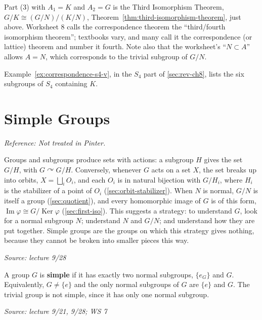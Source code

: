 \documentclass[11pt]{report}
\newcommand{\srcline}[1]{\par\hfill{\footnotesize\textit{Source: #1}}}
\begin{document}
\begin{rembox}\label{rem:naming-isomorphism-theorems}
Part (3) with $A_1 = K$ and $A_2 = G$ is the Third Isomorphism Theorem, $G/K \cong (G/N)/(K/N)$, Theorem~\ref{thm:third-isomorphism-theorem}, just above. Worksheet 8 calls the correspondence theorem the ``third/fourth isomorphism theorem''; textbooks vary, and many call it the correspondence (or lattice) theorem and number it fourth. Note also that the worksheet's ``$N \subset A$'' allows $A = N$, which corresponds to the trivial subgroup of $G/N$.
\end{rembox}

Example~\ref{ex:correspondence-s4-v}, in the $S_4$ part of \ref{sec:rev-ch8}, lists the six subgroups of $S_4$ containing $K$.

\section{Simple Groups}\label{sec:simple}

\textit{Reference: Not treated in Pinter.}

\begin{rembox}\label{rem:picture-so-far}
Groups and subgroups produce sets with actions: a subgroup $H$ gives the set $G/H$, with $G \curvearrowright G/H$. Conversely, whenever $G$ acts on a set $X$, the set breaks up into orbits, $X = \bigsqcup_i O_i$, and each $O_i$ is in natural bijection with $G/H_i$, where $H_i$ is the stabilizer of a point of $O_i$ (\ref{sec:orbit-stabilizer}). When $N$ is normal, $G/N$ is itself a group (\ref{sec:quotient}), and every homomorphic image of $G$ is of this form, $\operatorname{Im}\varphi \cong G/\operatorname{Ker}\varphi$ (\ref{sec:first-iso}). This suggests a strategy: to understand $G$, look for a normal subgroup $N$; understand $N$ and $G/N$; and understand how they are put together. Simple groups are the groups on which this strategy gives nothing, because they cannot be broken into smaller pieces this way.
\srcline{lecture 9/28}
\end{rembox}

\begin{defbox}\label{def:simple-group}
A group $G$ is \textbf{simple} if it has exactly two normal subgroups, $\{e_G\}$ and $G$. Equivalently, $G \neq \{e\}$ and the only normal subgroups of $G$ are $\{e\}$ and $G$. The trivial group is not simple, since it has only one normal subgroup.
\srcline{lecture 9/21, 9/28; WS 7}
\end{defbox}
\end{document}
